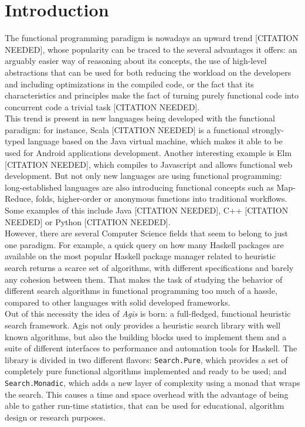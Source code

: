 \section{Introduction}

The functional programming paradigm is nowadays an upward trend [CITATION
NEEDED], whose popularity can be traced to the several advantages it offers: an
arguably easier way of reasoning about its concepts, the use of high-level
abstractions that can be used for both reducing the workload on the developers
and including optimizations in the compiled code, or the fact that its
characteristics and principles make the fact of turning purely functional code
into concurrent code a trivial task [CITATION NEEDED].\\

This trend is present in new languages being developed with the functional
paradigm: for instance, Scala [CITATION NEEDED] is a functional strongly-typed
language based on the Java virtual machine, which makes it able to be used for
Android applications development. Another interesting example is Elm [CITATION
NEEDED], which compiles to Javascript and allows functional web development.
But not only new languages are using functional programming: long-established
languages are also introducing functional concepts such as Map-Reduce, folds,
higher-order or anonymous functions into traditional workflows. Some examples
of this include Java [CITATION NEEDED], C++ [CITATION NEEDED] or Python
[CITATION NEEDED].\\


However, there are several Computer Science fields that seem to belong to just
one paradigm. For example, a quick query on how many Haskell packages are
available on the most popular Haskell package manager related to heuristic
search returns a scarce set of algorithms, with different specifications and
barely any cohesion between them. That makes the task of studying the behavior
of different search algorithms in functional programming too much of a hassle,
compared to other languages with solid developed frameworks.\\

Out of this necessity the idea of \emph{Agis} is born: a full-fledged,
functional heuristic search framework. Agis not only provides a heuristic
search library with well known algorithms, but also the building blocks used to
implement them and a suite of different interfaces to performance and
automation tools for Haskell. The library is divided in two different flavors:
\texttt{Search.Pure}, which provides a set of completely pure functional
algorithms implemented and ready to be used; and \texttt{Search.Monadic}, which
adds a new layer of complexity using a monad that wraps the search. This causes
a time and space overhead with the advantage of being able to gather run-time
statistics, that can be used for educational, algorithm design or research
purposes.
